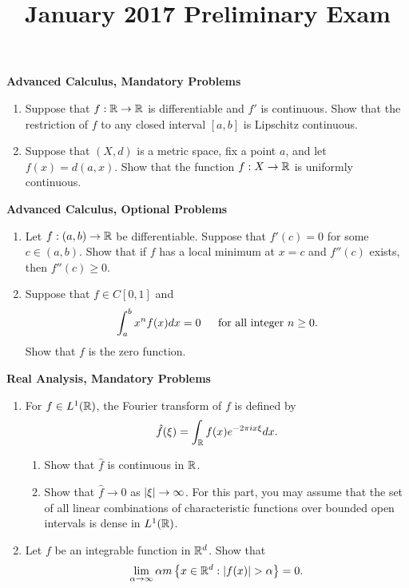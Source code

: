 \documentclass[11pt,twoside]{amsart}
\title{January 2017 Preliminary Exam}
\author{}
\theoremstyle{plain}
\begin{document}
\maketitle

\begin{center}
{\bf\Large Advanced Calculus, Mandatory Problems}
\end{center}
\setcounter{enumi}{2}
\begin{enumerate}
    \item Suppose that $f:\mathbb{R} \rightarrow \mathbb{R}$ is differentiable and $f'$ is continuous.
    Show that the restriction of $f$ to any closed interval $[a,b]$ is Lipschitz continuous.
    \vspace{12pt}
    \item Suppose that $(X,d)$ is a metric space, fix a point $a$, and let $f(x) = d(a,x)$.
    Show that the function $f: X \rightarrow \mathbb{R}$ is uniformly continuous.
\end{enumerate}
\vspace{12pt}
\begin{center}
{\bf\Large Advanced Calculus, Optional Problems}
\end{center}

\begin{enumerate}
    \item Let $f:(a,b) \to \mathbb{R}$ be differentiable.
    Suppose that $f'(c) = 0$ for some $c\in (a,b)$.
    Show that if $f$ has a local minimum at $x=c$ and $f''(c)$ exists, then $f''(c) \geq 0$.
    \vspace{12pt}
    \item Suppose that $f\in C[0,1]$ and 
    \[
        \int_a^b{x^nf(x)dx} = 0 \textrm{\hspace{12pt} for all integer } n\geq 0.
    \]
    Show that $f$ is the zero function.
\end{enumerate}
\newpage

\begin{center}
{\bf\Large Real Analysis, Mandatory Problems}
\end{center}
\setcounter{enumi}{0}
\begin{enumerate}
    \item For $f \in L^1(\mathbb{R})$, the Fourier transform of $f$ is defined by
    \[
        \hat{f}(\xi) = \int_{\mathbb{R}}{f(x)e^{-2\pi ix\xi}dx}.
    \]
    \vspace{12pt}
    \begin{enumerate}
    \item Show that $\hat{f}$ is continuous in $\mathbb{R}$.
    \item Show that $\hat{f} \rightarrow 0$ as $\left| \xi \right| \rightarrow \infty$.
    For this part, you may assume that the set of all linear combinations of characteristic functions over bounded open intervals is dense in $L^1(\mathbb{R})$.
    \end{enumerate}
    \vspace{12pt}
    \item Let $f$ be an integrable function in $\mathbb{R}^d$.
    Show that
    \[
        \lim_{\alpha\rightarrow\infty}{\alpha m\left\{x\in\R^d : \card{f(x)}>\alpha\right\}} = 0.
    \]
\end{enumerate}
\end{document}
